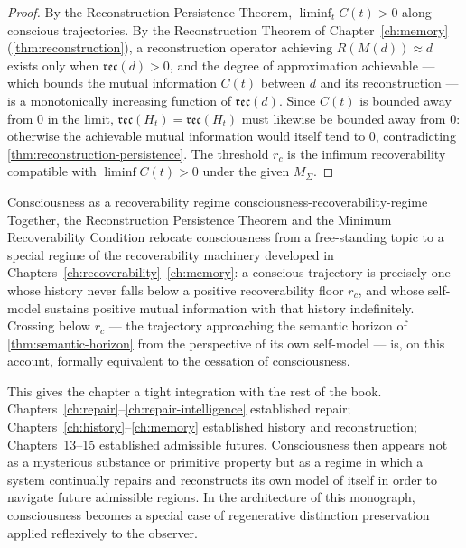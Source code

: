 \documentclass[12pt,twoside,openright]{book}
\newcommand{\reco}{\mathfrak{rec}}
\begin{document}
\begin{proof}
  By the Reconstruction Persistence Theorem,
  $\liminf_t C(t) > 0$ along conscious trajectories. By the
  Reconstruction Theorem of Chapter~\ref{ch:memory}
  (\cref{thm:reconstruction}), a reconstruction operator
  achieving $R(M(d))\approx d$ exists only when
  $\reco(d) > 0$, and the degree of approximation achievable
  --- which bounds the mutual information $C(t)$ between $d$
  and its reconstruction --- is a monotonically increasing
  function of $\reco(d)$. Since $C(t)$ is bounded away from
  $0$ in the limit, $\reco(H_t) = \mathfrak{rec}(H_t)$ must
  likewise be bounded away from $0$: otherwise the
  achievable mutual information would itself tend to $0$,
  contradicting \cref{thm:reconstruction-persistence}. The
  threshold $r_c$ is the infimum recoverability compatible
  with $\liminf C(t) > 0$ under the given $M_\Sigma$.
\end{proof}

\begin{remark}{Consciousness as a recoverability regime}%
  {consciousness-recoverability-regime}
  Together, the Reconstruction Persistence Theorem and the
  Minimum Recoverability Condition relocate consciousness
  from a free-standing topic to a special regime of the
  recoverability machinery developed in
  Chapters~\ref{ch:recoverability}--\ref{ch:memory}: a
  conscious trajectory is precisely one whose history never
  falls below a positive recoverability floor $r_c$, and
  whose self-model sustains positive mutual information with
  that history indefinitely. Crossing below $r_c$ --- the
  trajectory approaching the semantic horizon of
  \cref{thm:semantic-horizon} from the perspective of its
  own self-model --- is, on this account, formally
  equivalent to the cessation of consciousness.
\end{remark}

This gives the chapter a tight integration with the rest of
the book. Chapters~\ref{ch:repair}--\ref{ch:repair-intelligence}
established repair; Chapters~\ref{ch:history}--\ref{ch:memory}
established history and reconstruction; Chapters~13--15
established admissible futures. Consciousness then appears
not as a mysterious substance or primitive property but as
a regime in which a system continually repairs and
reconstructs its own model of itself in order to navigate
future admissible regions. In the architecture of this
monograph, consciousness becomes a special case of
regenerative distinction preservation applied reflexively
to the observer.
\end{document}
